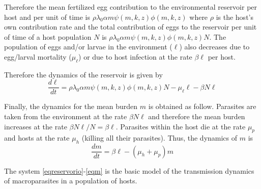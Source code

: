 \documentclass[12pt,a4paper]{article}
\theoremstyle{plain}%
\theoremstyle{definition}
\theoremstyle{remark}
\begin{document}
Therefore the mean fertilized egg contribution to the environmental reservoir  per host and per unit of time is
$\rho\lambda_0
\alpha m
\psi(m,k,z) \phi(m,k,z)$ where $\rho$ 
is the host's own contribution rate and the total contribution of eggs to the reservoir per unit of time of a host population $N$ is 
$\rho\lambda_0
\alpha m
\psi(m,k,z) \phi(m,k,z) N$. 
The population of eggs and/or larvae in the environment ($\ell$) also decreases due to egg/larval mortality ($\mu_{\ell}$) or due to host infection at the rate $\beta \ell$ per host. 

Therefore the dynamics of the reservoir is given by
	\begin{equation}\label{eqreservorio}
	\dfrac{d\ell}{dt}= \rho\lambda_0
	\alpha m
	\psi(m,k,z) \phi(m,k,z) N- \mu_{\ell} \ell -\beta N \ell 
	\end{equation}

Finally, the dynamics for the mean burden $m$ is obtained as follow. Parasites are taken from the environment at the rate 	$\beta N \ell $ and therefore the mean burden increases at the rate  $\beta  N\ell/N=\beta\ell $. Parasites within the host die at the rate $\mu_p$ and hosts at the rate $\mu_h$ (killing all their parasites). Thus, the dynamics of $m$ is
\begin{equation}\label{eqm}
	\dfrac{dm}{dt}=\beta \ell - (\mu_h+\mu_p)m
	\end{equation}
	
	The system \eqref{eqreservorio}-\eqref{eqm} is the basic model of the transmission dynamics of macroparasites in a population of hosts. 
\end{document}
